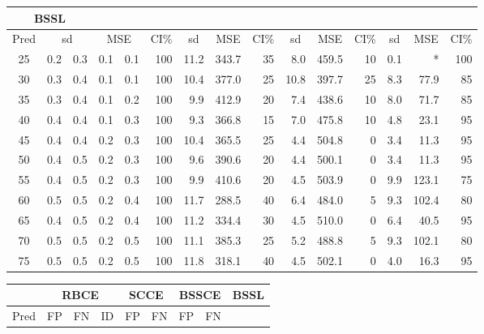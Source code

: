 \documentclass[preprint,12pt]{elsarticle}
\begin{document}
\begin{table}[h]
\begin{tabular}{c|rrrrr|rrr|rrr|rrr}
		\multicolumn{3}{c}{BSSL}\\
		\hline
		\multicolumn{1}{c|}{Pred}&
		\multicolumn{2}{c}{sd}&
		\multicolumn{2}{c}{MSE}&
		\multicolumn{1}{c|}{CI\%}&
		\multicolumn{1}{c}{sd}&
		\multicolumn{1}{c}{MSE}&
		\multicolumn{1}{c|}{CI\%}&
		\multicolumn{1}{c}{sd}&
		\multicolumn{1}{c}{MSE}&
		\multicolumn{1}{c|}{CI\%}&
		\multicolumn{1}{c}{sd}&
		\multicolumn{1}{c}{MSE}&
		\multicolumn{1}{c}{CI\%}
		\\
		\hline
		25 & 0.2 & 0.3 & 0.1 & 0.1 & 100 & 11.2 & 343.7 & 35 & 8.0 & 459.5 & 10 & 0.1 & * & 100 \\ 
		30 & 0.3 & 0.4 & 0.1 & 0.1 & 100 & 10.4 & 377.0 & 25 & 10.8 & 397.7 & 25 & 8.3 & 77.9 & 85 \\ 
		35 & 0.3 & 0.4 & 0.1 & 0.2 & 100 & 9.9 & 412.9 & 20 & 7.4 & 438.6 & 10 & 8.0 & 71.7 & 85 \\ 
		40 & 0.4 & 0.4 & 0.1 & 0.3 & 100 & 9.3 & 366.8 & 15 & 7.0 & 475.8 & 10 & 4.8 & 23.1 & 95 \\ 
		45 & 0.4 & 0.4 & 0.2 & 0.3 & 100 & 10.4 & 365.5 & 25 & 4.4 & 504.8 & 0 & 3.4 & 11.3 & 95 \\ 
		50 & 0.4 & 0.5 & 0.2 & 0.3 & 100 & 9.6 & 390.6 & 20 & 4.4 & 500.1 & 0 & 3.4 & 11.3 & 95 \\ 
		55 & 0.4 & 0.5 & 0.2 & 0.3 & 100 & 9.9 & 410.6 & 20 & 4.5 & 503.9 & 0 & 9.9 & 123.1 & 75 \\ 
		60 & 0.5 & 0.5 & 0.2 & 0.4 & 100 & 11.7 & 288.5 & 40 & 6.4 & 484.0 & 5 & 9.3 & 102.4 & 80 \\ 
		65 & 0.4 & 0.5 & 0.2 & 0.4 & 100 & 11.2 & 334.4 & 30 & 4.5 & 510.0 & 0 & 6.4 & 40.5 & 95 \\ 
		70 & 0.5 & 0.5 & 0.2 & 0.5 & 100 & 11.1 & 385.3 & 25 & 5.2 & 488.8 & 5 & 9.3 & 102.1 & 80 \\ 
		75 & 0.5 & 0.5 & 0.2 & 0.5 & 100 & 11.8 & 318.1 & 40 & 4.5 & 502.1 & 0 & 4.0 & 16.3 & 95 \\ 
		\hline
	\end{tabular}
	\begin{tabular}{c|rrr|rr|rr|rr}
		\hline
		\multicolumn{1}{c|}{}&
		\multicolumn{3}{c|}{RBCE}&
		\multicolumn{2}{c|}{SCCE}&
		\multicolumn{2}{c|}{BSSCE}&
		\multicolumn{2}{c}{BSSL}\\
		\hline
		\multicolumn{1}{c|}{Pred}&
		\multicolumn{1}{c}{FP}&
		\multicolumn{1}{c}{FN}&
		\multicolumn{1}{c|}{ID}&
		\multicolumn{1}{c}{FP}&
		\multicolumn{1}{c|}{FN}&
		\multicolumn{1}{c}{FP}&
		\multicolumn{1}{c|}{FN}&

\end{tabular}
\end{table}
\end{document}
